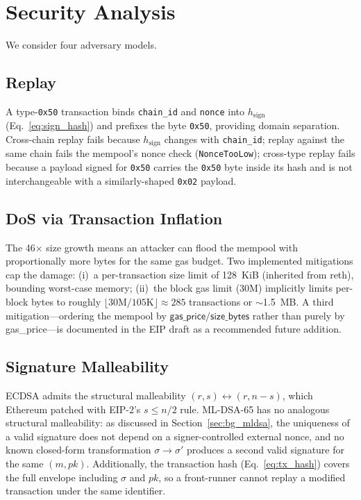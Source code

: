 \documentclass[journal,onecolumn,11pt]{IEEEtran}
\begin{document}
\section{Security Analysis}
\label{sec:security}

We consider four adversary models.

\subsection{Replay} A type-\texttt{0x50} transaction binds \texttt{chain\_id} and \texttt{nonce} into $h_{\text{sign}}$ (Eq.~\eqref{eq:sign_hash}) and prefixes the byte \texttt{0x50}, providing domain separation. Cross-chain replay fails because $h_{\text{sign}}$ changes with \texttt{chain\_id}; replay against the same chain fails the mempool's nonce check (\texttt{NonceTooLow}); cross-type replay fails because a payload signed for \texttt{0x50} carries the \texttt{0x50} byte inside its hash and is not interchangeable with a similarly-shaped \texttt{0x02} payload.

\subsection{DoS via Transaction Inflation} The 46$\times$ size growth means an attacker can flood the mempool with proportionally more bytes for the same gas budget. Two implemented mitigations cap the damage: (i)~a per-transaction size limit of 128~KiB (inherited from reth), bounding worst-case memory; (ii)~the block gas limit (30M) implicitly limits per-block bytes to roughly $\lfloor 30\text{M}/105\text{K}\rfloor \approx 285$ transactions or $\sim$1.5~MB. A third mitigation---ordering the mempool by $\textsf{gas\_price}/\textsf{size\_bytes}$ rather than purely by \textsf{gas\_price}---is documented in the EIP draft as a recommended future addition.

\subsection{Signature Malleability} ECDSA admits the structural malleability $(r, s) \leftrightarrow (r, n{-}s)$, which Ethereum patched with EIP-2's $s \leq n/2$ rule. ML-DSA-65 has no analogous structural malleability: as discussed in Section~\ref{sec:bg_mldsa}, the uniqueness of a valid signature does not depend on a signer-controlled external nonce, and no known closed-form transformation $\sigma \to \sigma'$ produces a second valid signature for the same $(m, \mathit{pk})$. Additionally, the transaction hash (Eq.~\eqref{eq:tx_hash}) covers the full envelope including $\sigma$ and $\mathit{pk}$, so a front-runner cannot replay a modified transaction under the same identifier.
\end{document}
